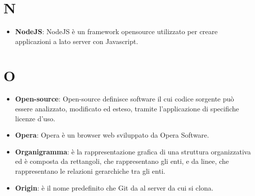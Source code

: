 \documentclass[a4paper, oneside, openany, dvipsnames, table]{article}
\begin{document}
\section{N}
\begin{itemize}
\item \textbf{NodeJS}: NodeJS è un framework opensource utilizzato per creare applicazioni a lato server con Javascript.
\end{itemize}

\section{O}
\begin{itemize}
\item \textbf{Open-source}: Open-source definisce software il cui codice sorgente può essere analizzato, modificato ed esteso, tramite l'applicazione di specifiche licenze d'uso.
\item \textbf{Opera}: Opera è un browser web sviluppato da Opera Software.
\item \textbf{Organigramma}: è la rappresentazione grafica di una struttura organizzativa ed è composta da rettangoli, che rappresentano gli enti, e da linee, che rappresentano le relazioni gerarchiche tra gli enti.
\item \textbf{Origin}: è il nome predefinito che Git da al server da cui si clona.
\end{itemize}
\end{document}
